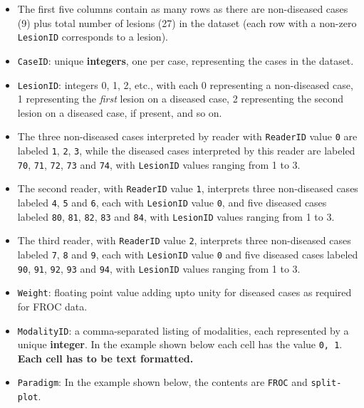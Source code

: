 \documentclass[]{book}
\providecommand{\tightlist}{%
  \setlength{\itemsep}{0pt}\setlength{\parskip}{0pt}}
\begin{document}
\begin{itemize}
\tightlist
\item
  The first five columns contain as many rows as there are non-diseased cases (9) plus total number of lesions (27) in the dataset (each row with a non-zero \texttt{LesionID} corresponds to a lesion).
\item
  \texttt{CaseID}: unique \textbf{integers}, one per case, representing the cases in the dataset.
\item
  \texttt{LesionID}: integers 0, 1, 2, etc., with each 0 representing a non-diseased case, 1 representing the \emph{first} lesion on a diseased case, 2 representing the second lesion on a diseased case, if present, and so on.
\item
  The three non-diseased cases interpreted by reader with \texttt{ReaderID} value \texttt{0} are labeled \texttt{1}, \texttt{2}, \texttt{3}, while the diseased cases interpreted by this reader are labeled \texttt{70}, \texttt{71}, \texttt{72}, \texttt{73} and \texttt{74}, with \texttt{LesionID} values ranging from 1 to 3.\\
\item
  The second reader, with \texttt{ReaderID} value \texttt{1}, interprets three non-diseased cases labeled \texttt{4}, \texttt{5} and \texttt{6}, each with \texttt{LesionID} value \texttt{0}, and five diseased cases labeled \texttt{80}, \texttt{81}, \texttt{82}, \texttt{83} and \texttt{84}, with \texttt{LesionID} values ranging from 1 to 3.\\
\item
  The third reader, with \texttt{ReaderID} value \texttt{2}, interprets three non-diseased cases labeled \texttt{7}, \texttt{8} and \texttt{9}, each with \texttt{LesionID} value \texttt{0} and five diseased cases labeled \texttt{90}, \texttt{91}, \texttt{92}, \texttt{93} and \texttt{94}, with \texttt{LesionID} values ranging from 1 to 3.\\
\item
  \texttt{Weight}: floating point value adding upto unity for diseased cases as required for FROC data.
\item
  \texttt{ModalityID}: a comma-separated listing of modalities, each represented by a unique \textbf{integer}. In the example shown below each cell has the value \texttt{0,\ 1}. \textbf{Each cell has to be text formatted.}
\item
  \texttt{Paradigm}: In the example shown below, the contents are \texttt{FROC} and \texttt{split-plot}.
\end{itemize}
\end{document}
